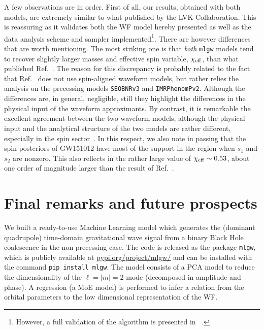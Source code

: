 \documentclass[twocolumn,showpacs,preprintnumbers,nofootinbib,prd,
superscriptaddress,10pt]{revtex4-1}
\begin{document}
A few observations are in order. First of all, our results, obtained with both models,
are extremely similar to what published by the LVK Collaboration. 
This is reassuring as it validates both the WF model hereby presented 
as well as the data analysis scheme and sampler 
implemented\footnote{However, a full validation of the algorithm is presented in ~\cite{gwmodel}.}.
There are however differences that are worth mentioning. The most striking one is that
{\it both} \texttt{mlgw} models tend to recover slightly larger masses and effective 
spin variable, $\chi_{\rm eff}$, than what published Ref.~\cite{LIGOScientific:2018mvr}.
The reason for this discrepancy is probably related to the fact that Ref.~\cite{LIGOScientific:2018mvr}
does not use spin-aligned waveform models, but rather relies the analysis on 
the precessing models \texttt{SEOBNRv3} and \texttt{IMRPhenomPv2}. Although the differences 
are, in general, negligible, still they highlight the differences in the physical input of 
the waveform approximants. By contrast, it is remarkable the excellent agreement between the
two waveform models, although the physical input and the analytical structure of the
two models are rather different, especially in the spin sector~\cite{Rettegno:2019tzh}.
In this respect, we also note in passing that the spin posteriors of GW151012 have
most of the support in the region when $s_1$ and $s_2$ are nonzero. This also
reflects in the rather large value of $\chi_{\rm eff}\sim 0.53$, about one order of magnitude
larger than the result of Ref.~\cite{LIGOScientific:2018mvr}.

\section{Final remarks and future prospects}
\label{sec:end}
We built a ready-to-use Machine Learning model which generates the (dominant quadrupole) time-domain gravitational wave 
signal from a binary Black Hole coalescence in the non precessing case. The code is released as the package \texttt{mlgw}, which is publicly available at 
\href{https://pypi.org/project/mlgw/}{pypi.org/project/mlgw/} and can be installed with the command \texttt{pip install mlgw}.
The model consists of a PCA model to reduce the dimensionality of the ${\ell=|m|=2}$ mode (decomposed in amplitude and phase). 
A regression (a MoE model) is performed to infer a relation from the orbital parameters to the low dimensional representation of the WF.
\end{document}
